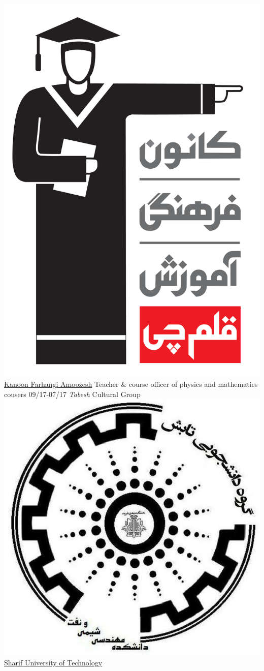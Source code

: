 \documentclass[a4paper]{friggeri-cv}
\begin{document}
\begin{entrylist}
    {\href{http://www.kanoon.ir}{\includegraphics[scale=0.005]{img/Kanoon_logo.png} Kanoon Farhangi Amoozesh}}
    {Teacher \& course officer of physics and mathematics cousers}
  \entry
    {09/17-07/17}
    {   \emph{Tabesh} Cultural Group}
    {\href{http://www.sharif.ir}{\includegraphics[scale=0.03]{img/Tabesh_logo.jpg} Sharif University of Technology}}

\end{entrylist}
\end{document}
